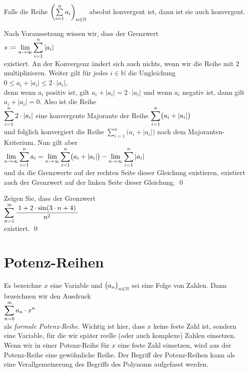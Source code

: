 \begin{Satz}
  Falls die Reihe $\left(\sum\limits_{i=1}^n a_i\right)_{n\in\mathbb{N}}$ absolut konvergent ist, dann ist sie auch konvergent.
\end{Satz}

\proof
Nach Voraussetzung wissen wir, dass der Grenzwert
\\[0.2cm]
\hspace*{1.3cm}
$\displaystyle s := \lim\limits_{n\rightarrow\infty} \sum\limits_{i=1}^{n} |a_i|$
\\[0.2cm]
existiert.  An der Konvergenz \"andert sich auch nichts, wenn wir die Reihe mit $2$ multiplizieren.
Weiter gilt f\"ur jedes $i \in \mathbb{N}$ die Ungleichung
\\[0.2cm]
\hspace*{1.3cm}
$0 \leq a_i + |a_i| \leq 2 \cdot |a_i|$,
\\[0.2cm]
denn wenn $a_i$ positiv ist, gilt $a_i + |a_i| = 2 \cdot |a_i|$ und wenn $a_i$ negativ ist, dann
gilt $a_i + |a_i| = 0$.  Also ist die Reihe 
\\[0.2cm]
\hspace*{1.3cm}
$\displaystyle \sum\limits_{i=1}^{n} 2 \cdot |a_i|$ \quad eine konvergente Majorante der Reihe \quad
$\displaystyle \sum\limits_{i=1}^{n} \bigl(a_i + |a_i|\bigr)$
\\[0.2cm]
und folglich konvergiert die Reihe $\sum\limits_{i=1}^{n} \bigl(a_i + |a_i|\bigr)$ nach dem Majoranten-Kriterium.
Nun gilt aber
\\[0.2cm]
\hspace*{1.3cm}
$\displaystyle \lim\limits_{n\rightarrow\infty} \sum\limits_{i=1}^{n} a_i =
     \lim\limits_{n\rightarrow\infty}\sum\limits_{i=1}^{n} \bigl(a_i + |a_i|\bigr) 
   - \lim\limits_{n\rightarrow\infty} \sum\limits_{i=1}^{n} |a_i|$
\\[0.2cm]
und da die Grenzwerte auf der rechten Seite dieser Gleichung existieren, existiert auch der
Grenzwert auf der linken Seite dieser Gleichung.  \qed

\exercise
Zeigen Sie, dass der Grenzwert
\\[0.2cm]
\hspace*{1.3cm}
$\displaystyle\sum\limits_{n=1}^{\infty} \frac{\;1 + 2 \cdot \sin(3 \cdot n + 4)\;}{n^2}$
\\[0.2cm]
existiert.  \qed


\section{Potenz-Reihen}
Es bezeichne $x$ eine Variable und $\bigl(a_n\bigr)_{n\in\mathbb{N}}$ sei eine Folge von Zahlen.  Dann
bezeichnen wir den Ausdruck
\\[0.2cm]
\hspace*{1.3cm}
$\displaystyle\sum\limits_{n=0}^\infty a_n \cdot  x^n$      
\\[0.2cm]
als \emph{formale Potenz-Reihe}.  Wichtig ist hier, dass $x$ keine feste Zahl ist, sondern
eine Variable, f\"ur die wir sp\"ater reelle (oder auch komplexe) Zahlen einsetzen.  Wenn wir
in einer Potenz-Reihe f\"ur $x$ eine feste Zahl einsetzen, wird aus der Potenz-Reihe eine
gew\"ohnliche Reihe.  Der Begriff der Potenz-Reihen kann als eine Verallgemeinerung des
Begriffs des   Polynoms aufgefasst werden. 


